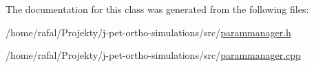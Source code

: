 The documentation for this class was generated from the following files\+:\begin{DoxyCompactItemize}
\item 
/home/rafal/\+Projekty/j-\/pet-\/ortho-\/simulations/src/\hyperlink{parammanager_8h}{parammanager.\+h}\item 
/home/rafal/\+Projekty/j-\/pet-\/ortho-\/simulations/src/\hyperlink{parammanager_8cpp}{parammanager.\+cpp}\end{DoxyCompactItemize}
